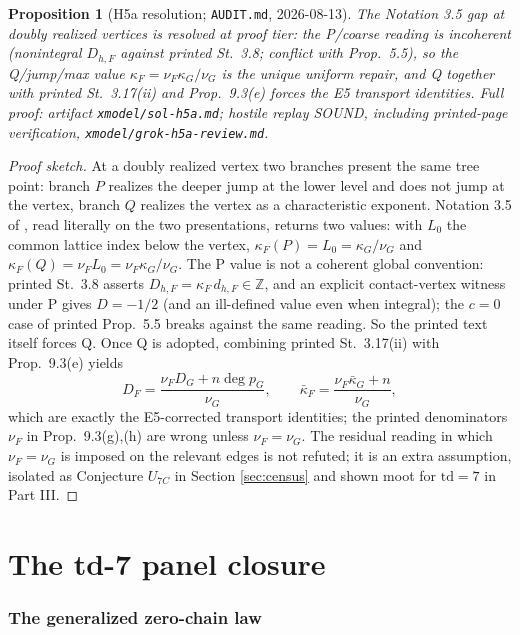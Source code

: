 \documentclass[11pt]{article}
\newtheorem{proposition}[theorem]{Proposition}
\theoremstyle{definition}
\theoremstyle{remark}
\newcommand{\kb}{\bar\kappa}
\begin{document}
\begin{proposition}[H5a resolution; \texttt{AUDIT.md}, 2026-08-13]\label{prop:h5a}
The Notation 3.5 gap at doubly realized vertices is resolved at proof tier: the P/coarse reading is incoherent (nonintegral $D_{h,F}$ against printed St.~3.8; conflict with Prop.~5.5), so the Q/jump/max value $\kappa_F=\nu_F\kappa_G/\nu_G$ is the unique uniform repair, and Q together with printed St.~3.17(ii) and Prop.~9.3(e) forces the E5 transport identities. Full proof: artifact \texttt{xmodel/sol-h5a.md}; hostile replay SOUND, including printed-page verification, \texttt{xmodel/grok-h5a-review.md}.
\end{proposition}

\begin{proof}[Proof sketch]
At a doubly realized vertex two branches present the same tree point: branch $P$ realizes the deeper jump at the lower level and does not jump at the vertex, branch $Q$ realizes the vertex as a characteristic exponent. Notation 3.5 of \cite{Sigray}, read literally on the two presentations, returns two values: with $L_0$ the common lattice index below the vertex, $\kappa_F(P)=L_0=\kappa_G/\nu_G$ and $\kappa_F(Q)=\nu_F L_0=\nu_F\kappa_G/\nu_G$. The P value is not a coherent global convention: printed St.~3.8 asserts $D_{h,F}=\kappa_F\,d_{h,F}\in\mathbb{Z}$, and an explicit contact-vertex witness under P gives $D=-1/2$ (and an ill-defined value even when integral); the $c=0$ case of printed Prop.~5.5 breaks against the same reading. So the printed text itself forces Q. Once Q is adopted, combining printed St.~3.17(ii) with Prop.~9.3(e) yields
\[
D_F=\frac{\nu_F D_G+n\deg p_G}{\nu_G},\qquad \kb_F=\frac{\nu_F\kb_G+n}{\nu_G},
\]
which are exactly the E5-corrected transport identities; the printed denominators $\nu_F$ in Prop.~9.3(g),(h) are wrong unless $\nu_F=\nu_G$. The residual reading in which $\nu_F=\nu_G$ is imposed on the relevant edges is not refuted; it is an extra assumption, isolated as Conjecture $U_{7C}$ in Section \ref{sec:census} and shown moot for $\mathrm{td}=7$ in Part III.
\end{proof}

\part{The td-7 panel closure}

\section{The generalized zero-chain law}\label{sec:zcl}
\end{document}
